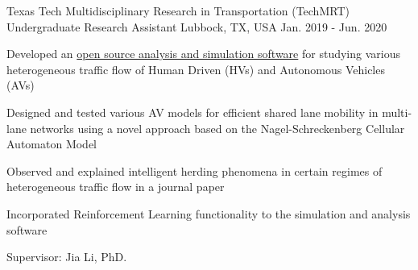 \begin{cventries}



    \cventry
    {Texas Tech Multidisciplinary Research in Transportation (TechMRT)}
    {Undergraduate Research Assistant}
    {Lubbock, TX, USA}
    {Jan. 2019 - Jun. 2020}
    {
        \begin{cvitems}
        \item{Developed an \href{https://github.com/shanto268/comprehensive_simulation_traffic_analysis_software}{open source analysis and simulation software} for studying various heterogeneous traffic flow of Human Driven (HVs) and Autonomous Vehicles (AVs)}
        \item{Designed and tested various AV models for efficient shared lane mobility in multi-lane networks using a novel approach based on the Nagel-Schreckenberg Cellular Automaton Model}
        \item{Observed and explained intelligent herding phenomena in certain regimes of heterogeneous traffic flow in a journal paper}
        \item{Incorporated Reinforcement Learning functionality to the simulation and analysis software}
        \item{Supervisor: Jia Li, PhD.}
        \end{cvitems}
        \vspace{1em}
    }


\end{cventries}
